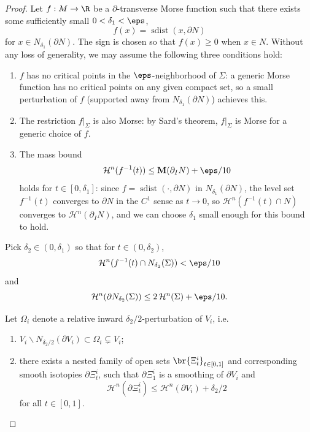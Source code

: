\begin{proof}
        Let $f: M \to \R$ be a $\partial$-transverse Morse function such that there exists some sufficiently small $0 < \delta_1 < \eps$,
        \begin{equation*}
            f(x) = \operatorname{sdist}(x, \partial N)
        \end{equation*}
        for $x \in N_{\delta_1}(\partial N)$. The sign is chosen so that $f(x) \geq 0$ when $x \in N$. Without any loss of generality, we may assume the following three conditions hold:
        \begin{enumerate}
            \item[(i)] $f$ has no critical points in the $\eps$-neighborhood of $\Sigma$: a generic Morse function has no critical points on any given compact set, so a small perturbation of $f$ (supported away from $N_{\delta_1}(\partial N)$) achieves this.
            \item[(ii)] The restriction $f|_\Sigma$ is also Morse: by Sard's theorem, $f|_\Sigma$ is Morse for a generic choice of $f$.
            \item[(iii)] The mass bound
        \begin{equation*}
            \mathcal{H}^n(f^{-1}(t)) \leq \mathbf{M}(\partial_I N) + \eps/10
        \end{equation*}
        holds for $t \in [0, \delta_1]$: since $f = \operatorname{sdist}(\cdot, \partial N)$ in $N_{\delta_1}(\partial N)$, the level set $f^{-1}(t)$ converges to $\partial N$ in the $C^1$ sense as $t \to 0$, so $\mathcal{H}^n(f^{-1}(t) \cap N)$ converges to $\mathcal{H}^n(\partial_I N)$, and we can choose $\delta_1$ small enough for this bound to hold.
        \end{enumerate} Pick $\delta_2 \in (0, \delta_1)$ so that for $t \in (0, \delta_2)$,
        \begin{equation*}
            \mathcal{H}^n(f^{-1}(t)\cap N_{\delta_2}(\Sigma)) < \eps/10
        \end{equation*}
        and
        \begin{equation*}
            \mathcal{H}^n(\partial N_{\delta_2}(\Sigma)) \leq 2\,\mathcal{H}^n(\Sigma) + \eps/10.
        \end{equation*}

        Let $\Omega_i$ denote a relative inward $\delta_2/2$-perturbation of $V_i$, i.e.
        \begin{enumerate}
            \item[(a)] $V_i\backslash N_{\delta_2/2}(\partial V_i) \subset \Omega_i \subsetneq V_i$;
            \item[(b)] there exists a nested family of open sets $\br{\Xi_t^i}_{t \in [0, 1]}$ and corresponding smooth isotopies $\partial\Xi_t^i$, such that $\partial\Xi_1^i$ is a smoothing of $\partial V_i$ and
            \begin{equation*}
                \mathcal{H}^n(\partial\Xi_t^i) \leq \mathcal{H}^n(\partial V_i) + \delta_2/2
            \end{equation*}
            for all $t \in [0, 1]$.
        \end{enumerate}


\end{proof}
